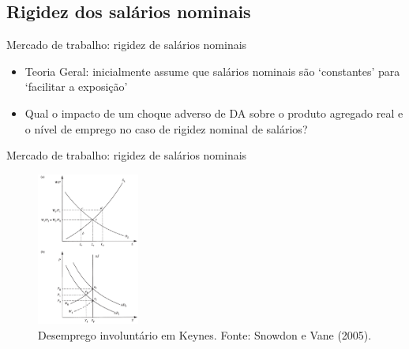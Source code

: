 \documentclass[10pt]{beamer}
\begin{document}
\subsection{Rigidez dos salários nominais}
\begin{frame}{Mercado de trabalho: rigidez de salários nominais}
    \begin{itemize}
        \item Teoria Geral: inicialmente assume que salários nominais são `constantes' para `facilitar a exposição'
        \bigskip
        \bigskip
        \item Qual o impacto de um choque adverso de DA sobre o produto agregado real e o nível de emprego no caso de rigidez nominal de salários?
    \end{itemize}
\end{frame}

\begin{frame}{Mercado de trabalho: rigidez de salários nominais}
    \begin{figure}
        \centering
        \includegraphics[width=0.3\textwidth]{./figures/aula5_fig1.PNG}
        \caption{Desemprego involuntário em Keynes. Fonte: Snowdon e Vane (2005).}
        \label{fig1}
    \end{figure}
\end{frame}
\end{document}
